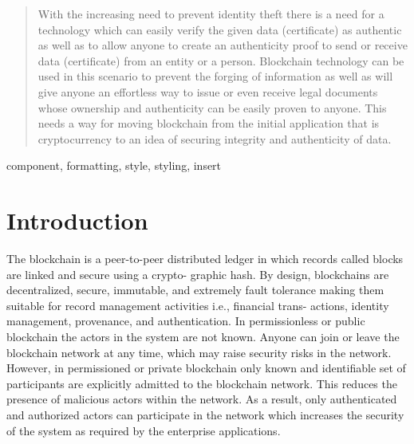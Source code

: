 \documentclass[conference]{IEEEtran}
\begin{document}
\begin{abstract}
With the increasing need to prevent identity theft there is a need for a technology which can easily verify the given data (certificate) as authentic as well as to allow anyone to create an authenticity proof to send or receive data (certificate) from an entity or a person. Blockchain technology can be used in this scenario to prevent the forging of information as well as will give anyone an effortless way to issue or even receive legal documents whose ownership and authenticity can be easily proven to anyone. This needs a way for moving blockchain from the initial application that is cryptocurrency to an idea of securing integrity and authenticity of data.	
\end{abstract}

\begin{IEEEkeywords}
component, formatting, style, styling, insert
\end{IEEEkeywords}

\section{Introduction}
The blockchain is a peer-to-peer distributed ledger in which records called blocks are linked and secure using a crypto- graphic hash. By design, blockchains are decentralized, secure, immutable, and extremely fault tolerance making them suitable for record management activities i.e., ﬁnancial trans- actions, identity management, provenance, and authentication. In permissionless or public blockchain the actors in the system are not known. Anyone can join or leave the blockchain network at any time, which may raise security risks in the network. However, in permissioned or private blockchain only known and identiﬁable set of participants are explicitly admitted to the blockchain network. This reduces the presence of malicious actors within the network. As a result, only authenticated and authorized actors can participate in the network which increases the security of the system as required by the enterprise applications. 
\end{document}
